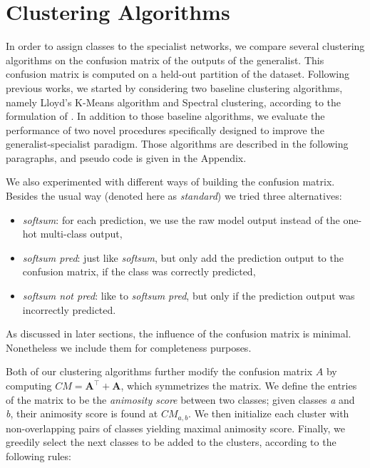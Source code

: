 \documentclass[graybox]{styles/svmult}
\begin{document}
\section{Clustering Algorithms}\label{clustering-algorithms}

In order to assign classes to the specialist networks, we compare
several clustering algorithms on the confusion matrix of the outputs of
the generalist. This confusion matrix is computed on a held-out
partition of the dataset. Following previous works, we started by
considering two baseline clustering algorithms, namely Lloyd's K-Means
algorithm and Spectral clustering, according to the formulation of
\cite{spectral}. In addition to those baseline algorithms, we evaluate
the performance of two novel procedures specifically designed to improve
the generalist-specialist paradigm. Those algorithms are described in
the following paragraphs, and pseudo code is given in the Appendix.

We also experimented with different ways of building the confusion
matrix. Besides the usual way (denoted here as \emph{standard}) we tried
three alternatives:

\begin{itemize}
\itemsep1pt\parskip0pt
\item
  \emph{softsum}: for each prediction, we use the raw model output
  instead of the one-hot multi-class output,
\item
  \emph{softsum pred}: just like \emph{softsum}, but only add the
  prediction output to the confusion matrix, if the class was correctly
  predicted,
\item
  \emph{softsum not pred}: like to \emph{softsum pred}, but only if
  the prediction output was incorrectly predicted.
\end{itemize}

As discussed in later sections, the influence of the confusion matrix is
minimal. Nonetheless we include them for completeness purposes.

Both of our clustering algorithms further modify the confusion matrix
$A$ by computing $CM = \textbf{A}^\top + \textbf{A}$, which symmetrizes
the matrix. We define the entries of the matrix to be the
\emph{animosity score} between two classes; given classes \emph{a} and
\emph{b}, their animosity score is found at $CM_{a, b}$. We then
initialize each cluster with non-overlapping pairs of classes yielding
maximal animosity score. Finally, we greedily select the next classes to
be added to the clusters, according to the following rules:
\end{document}
